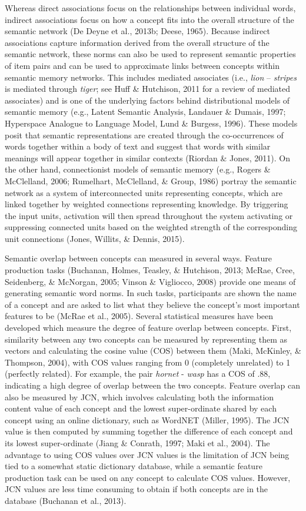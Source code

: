 \documentclass[english,,man]{apa6}
\begin{document}
Whereas direct associations focus on the relationships between individual words, indirect associations focus on how a concept fits into the overall structure of the semantic network (De Deyne et al., 2013b; Deese, 1965). Because indirect associations capture information derived from the overall structure of the semantic network, these norms can also be used to represent semantic properties of item pairs and can be used to approximate links between concepts within semantic memory networks. This includes mediated associates (i.e., \emph{lion} -- \emph{stripes} is mediated through \emph{tiger}; see Huff \& Hutchison, 2011 for a review of mediated associates) and is one of the underlying factors behind distributional models of semantic memory (e.g., Latent Semantic Analysis, Landauer \& Dumais, 1997; Hyperspace Analogue to Language Model, Lund \& Burgess, 1996). These models posit that semantic representations are created through the co-occurrences of words together within a body of text and suggest that words with similar meanings will appear together in similar contexts (Riordan \& Jones, 2011). On the other hand, connectionist models of semantic memory (e.g., Rogers \& McClelland, 2006; Rumelhart, McClelland, \& Group, 1986) portray the semantic network as a system of interconnected units representing concepts, which are linked together by weighted connections representing knowledge. By triggering the input units, activation will then spread throughout the system activating or suppressing connected units based on the weighted strength of the corresponding unit connections (Jones, Willits, \& Dennis, 2015).

Semantic overlap between concepts can measured in several ways. Feature production tasks (Buchanan, Holmes, Teasley, \& Hutchison, 2013; McRae, Cree, Seidenberg, \& McNorgan, 2005; Vinson \& Vigliocco, 2008) provide one means of generating semantic word norms. In such tasks, participants are shown the name of a concept and are asked to list what they believe the concept's most important features to be (McRae et al., 2005). Several statistical measures have been developed which measure the degree of feature overlap between concepts. First, similarity between any two concepts can be measured by representing them as vectors and calculating the cosine value (COS) between them (Maki, McKinley, \& Thompson, 2004), with COS values ranging from 0 (completely unrelated) to 1 (perfectly related). For example, the pair \emph{hornet} - \emph{wasp} has a COS of .88, indicating a high degree of overlap between the two concepts. Feature overlap can also be measured by JCN, which involves calculating both the information content value of each concept and the lowest super-ordinate shared by each concept using an online dictionary, such as WordNET (Miller, 1995). The JCN value is then computed by summing together the difference of each concept and its lowest super-ordinate (Jiang \& Conrath, 1997; Maki et al., 2004). The advantage to using COS values over JCN values is the limitation of JCN being tied to a somewhat static dictionary database, while a semantic feature production task can be used on any concept to calculate COS values. However, JCN values are less time consuming to obtain if both concepts are in the database (Buchanan et al., 2013).
\end{document}
